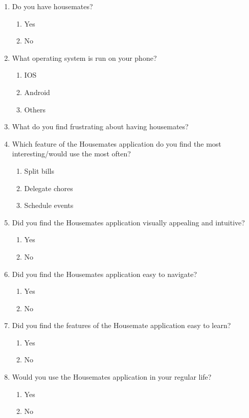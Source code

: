 \documentclass[12pt, titlepage]{article}
\begin{document}
\begin{enumerate}
    \item Do you have housemates?
    \begin{enumerate}
        \item Yes
        \item No
    \end{enumerate}
    \item What operating system is run on your phone?
    \begin{enumerate}
        \item IOS
        \item Android
        \item Others
    \end{enumerate}
    \item What do you find frustrating about having housemates?
    \item Which feature of the Housemates application do you find the most interesting/would use the most often?
    \begin{enumerate}
        \item Split bills
        \item Delegate chores
        \item Schedule events
    \end{enumerate}
    \item Did you find the Housemates application visually appealing and intuitive?
    \begin{enumerate}
        \item Yes
        \item No
    \end{enumerate}
    \item Did you find the Housemates application easy to navigate?
    \begin{enumerate}
        \item Yes
        \item No
    \end{enumerate}
    \item Did you find the features of the Housemate application easy to learn?
    \begin{enumerate}
        \item Yes
        \item No
    \end{enumerate}
    \item Would you use the Housemates application in your regular life?
    \begin{enumerate}
        \item Yes
        \item No
    \end{enumerate}
\end{enumerate}
\end{document}
